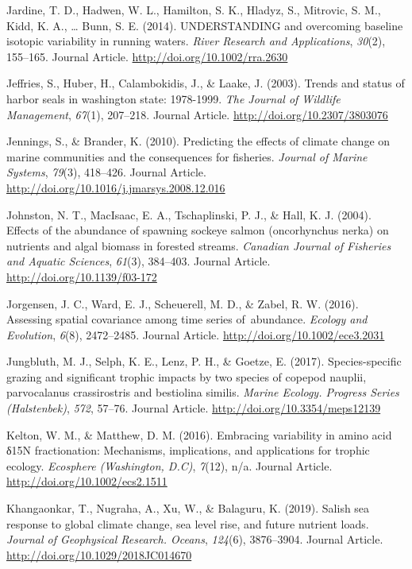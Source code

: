 \documentclass [11pt, proquest] {uwthesis}[2015/03/03]
\begin{document}
\hypertarget{ref-Jardine2014}{}
Jardine, T. D., Hadwen, W. L., Hamilton, S. K., Hladyz, S., Mitrovic, S.
M., Kidd, K. A., \ldots{} Bunn, S. E. (2014). UNDERSTANDING and
overcoming baseline isotopic variability in running waters. \emph{River
Research and Applications}, \emph{30}(2), 155--165. Journal Article.
\url{http://doi.org/10.1002/rra.2630}

\hypertarget{ref-Jeffries2003}{}
Jeffries, S., Huber, H., Calambokidis, J., \& Laake, J. (2003). Trends
and status of harbor seals in washington state: 1978-1999. \emph{The
Journal of Wildlife Management}, \emph{67}(1), 207--218. Journal
Article. \url{http://doi.org/10.2307/3803076}

\hypertarget{ref-Jennings2010}{}
Jennings, S., \& Brander, K. (2010). Predicting the effects of climate
change on marine communities and the consequences for fisheries.
\emph{Journal of Marine Systems}, \emph{79}(3), 418--426. Journal
Article. \url{http://doi.org/10.1016/j.jmarsys.2008.12.016}

\hypertarget{ref-Johnston2004}{}
Johnston, N. T., MacIsaac, E. A., Tschaplinski, P. J., \& Hall, K. J.
(2004). Effects of the abundance of spawning sockeye salmon
(oncorhynchus nerka) on nutrients and algal biomass in forested streams.
\emph{Canadian Journal of Fisheries and Aquatic Sciences}, \emph{61}(3),
384--403. Journal Article. \url{http://doi.org/10.1139/f03-172}

\hypertarget{ref-Jorgensen2016}{}
Jorgensen, J. C., Ward, E. J., Scheuerell, M. D., \& Zabel, R. W.
(2016). Assessing spatial covariance among time series of~abundance.
\emph{Ecology and Evolution}, \emph{6}(8), 2472--2485. Journal Article.
\url{http://doi.org/10.1002/ece3.2031}

\hypertarget{ref-Jungbluth2017}{}
Jungbluth, M. J., Selph, K. E., Lenz, P. H., \& Goetze, E. (2017).
Species-specific grazing and significant trophic impacts by two species
of copepod nauplii, parvocalanus crassirostris and bestiolina similis.
\emph{Marine Ecology. Progress Series (Halstenbek)}, \emph{572}, 57--76.
Journal Article. \url{http://doi.org/10.3354/meps12139}

\hypertarget{ref-McMahon2016}{}
Kelton, W. M., \& Matthew, D. M. (2016). Embracing variability in amino
acid δ15N fractionation: Mechanisms, implications, and applications for
trophic ecology. \emph{Ecosphere (Washington, D.C)}, \emph{7}(12), n/a.
Journal Article. \url{http://doi.org/10.1002/ecs2.1511}

\hypertarget{ref-Khangaonkar2019}{}
Khangaonkar, T., Nugraha, A., Xu, W., \& Balaguru, K. (2019). Salish sea
response to global climate change, sea level rise, and future nutrient
loads. \emph{Journal of Geophysical Research. Oceans}, \emph{124}(6),
3876--3904. Journal Article. \url{http://doi.org/10.1029/2018JC014670}
\end{document}

